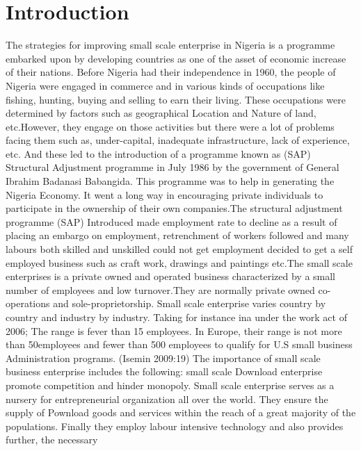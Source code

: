 \documentclass{article}
\begin{document}
\shortlorem



\section*{Introduction}
 


The strategies for improving small scale enterprise in Nigeria is a programme embarked
upon by developing countries as one of the asset of economic increase of their nations.
Before Nigeria had their independence in 1960, the people of Nigeria were engaged in
commerce and in various kinds of occupations like fishing, hunting, buying and selling to
earn their living. These occupations were determined by factors such as geographical
Location and Nature of land, etc.However, they engage on those activities but there were a lot of problems facing them
such as, under-capital, inadequate infrastructure, lack of experience, etc. And these led to
the introduction of a programme known as (SAP) Structural Adjustment programme in
July 1986 by the government of General Ibrahim Badanasi Babangida. This programme
was to help in generating the Nigeria Economy. It went a long way in encouraging private
individuals to participate in the ownership of their own companies.The structural adjustment programme (SAP) Introduced made employment rate to decline
as a result of placing an embargo on employment, retrenchment of workers followed and
many labours both skilled and unskilled could not get employment decided to get a self
employed business such as craft work, drawings and paintings etc.The small scale enterprises is a private owned and operated business characterized by a
small number of employees and low turnover.They are normally private owned co-operations and sole-proprietorship. Small scale
enterprise varies country by country and industry by industry. Taking for instance ina under the work act of 2006; The range is fever than 15 employees. In Europe,
their range is not more than 50employees and fewer than 500 employees to qualify for
U.S small business Administration programs. (Isemin 2009:19) The importance of small scale business enterprise includes the following: small scale Download
enterprise promote competition and hinder monopoly. Small scale enterprise serves as a
nursery for entrepreneurial organization all over the world. They ensure the supply of Pownload
goods and services within the reach of a great majority of the populations. Finally they
employ labour intensive technology and also provides further, the necessary
\end{document}
